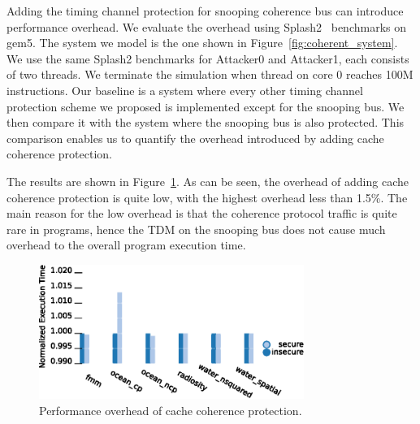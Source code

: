 Adding the timing channel protection for snooping coherence bus can introduce 
performance overhead. We evaluate the overhead using Splash2~\cite{splash2} benchmarks on 
gem5. The system we model is the one shown in Figure~\ref{fig:coherent_system}.
We use the same Splash2 benchmarks for Attacker0 and Attacker1, each consists 
of two threads. We terminate the simulation
when thread on core 0 reaches 100M instructions.  Our baseline is a system 
where every other timing channel protection scheme we proposed is implemented 
except for the snooping bus.
We then compare it with the system where the snooping bus is also protected. 
This comparison enables us to quantify the overhead introduced by adding 
cache coherence protection. 

The results are shown in Figure~\ref{fig:splash2}. As can be seen, the overhead 
of adding cache coherence protection is
quite low, with the highest overhead less than 1.5\%. 
The main reason for the low overhead is that the coherence protocol traffic 
is quite rare in programs, hence the TDM on the
snooping bus does not cause much overhead to the overall program execution 
time.

\begin{figure}
    \begin{center}
        \includegraphics[width=3.4in]{figs/SPLASH.eps}
        \caption{Performance overhead of cache coherence protection.}
        \label{fig:splash2}
    \end{center}
\end{figure}

